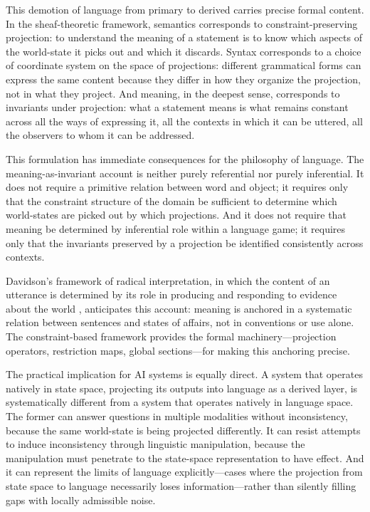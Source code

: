 \documentclass[11pt, oneside]{article}
\begin{document}
This demotion of language from primary to derived carries precise formal content. In the sheaf-theoretic framework, semantics corresponds to constraint-preserving projection: to understand the meaning of a statement is to know which aspects of the world-state it picks out and which it discards. Syntax corresponds to a choice of coordinate system on the space of projections: different grammatical forms can express the same content because they differ in how they organize the projection, not in what they project. And meaning, in the deepest sense, corresponds to invariants under projection: what a statement means is what remains constant across all the ways of expressing it, all the contexts in which it can be uttered, all the observers to whom it can be addressed.

This formulation has immediate consequences for the philosophy of language. The meaning-as-invariant account is neither purely referential nor purely inferential. It does not require a primitive relation between word and object; it requires only that the constraint structure of the domain be sufficient to determine which world-states are picked out by which projections. And it does not require that meaning be determined by inferential role within a language game; it requires only that the invariants preserved by a projection be identified consistently across contexts.

Davidson's framework of radical interpretation, in which the content of an utterance is determined by its role in producing and responding to evidence about the world \cite{davidson1984}, anticipates this account: meaning is anchored in a systematic relation between sentences and states of affairs, not in conventions or use alone. The constraint-based framework provides the formal machinery---projection operators, restriction maps, global sections---for making this anchoring precise.

The practical implication for AI systems is equally direct. A system that operates natively in state space, projecting its outputs into language as a derived layer, is systematically different from a system that operates natively in language space. The former can answer questions in multiple modalities without inconsistency, because the same world-state is being projected differently. It can resist attempts to induce inconsistency through linguistic manipulation, because the manipulation must penetrate to the state-space representation to have effect. And it can represent the limits of language explicitly---cases where the projection from state space to language necessarily loses information---rather than silently filling gaps with locally admissible noise.
\end{document}
